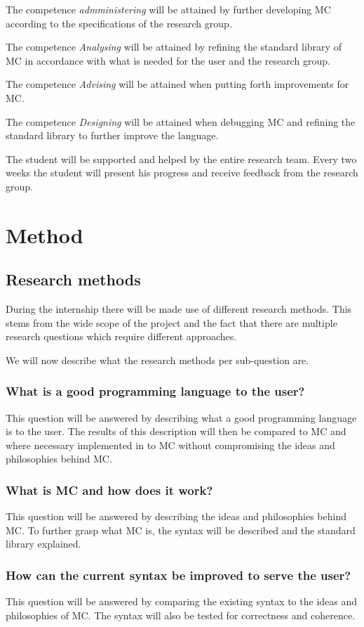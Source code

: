 The competence \emph{admministering} will be attained by further developing MC according to the specifications of the research group.

The competence \emph{Analysing} will be attained by refining the standard library of MC in accordance with what is needed for the user and the research group.

The competence \emph{Advising} will be attained when putting forth improvements for MC.

The competence \emph{Designing} will be attained when debugging MC and refining the standard library to further improve the language.

The student will be supported and helped by the entire research team.
Every two weeks the student will present his progress and receive feedback from the research group.


\section{Method}\label{ch:methodmandate}
\subsection{Research methods}
During the internship there will be made use of different research methods.
This stems from the wide scope of the project and the fact that there are multiple research questions which require different approaches.

We will now describe what the research methods per sub-question are.


\subsubsection{What is a good programming language to the user?}
This question will be answered by describing what a good programming language is to the user.
The results of this description will then be compared to MC and where necessary implemented in to MC without compromising the ideas and philosophies behind MC.

\subsubsection{What is MC and how does it work?}
This question will be answered by describing the ideas and philosophies behind MC.
To further grasp what MC is, the syntax will be described and the standard library explained.

\subsubsection{How can the current syntax be improved to serve the user?}
This question will be answered by comparing the existing syntax to the ideas and philosophies of MC.
The syntax will also be tested for correctness and coherence.

